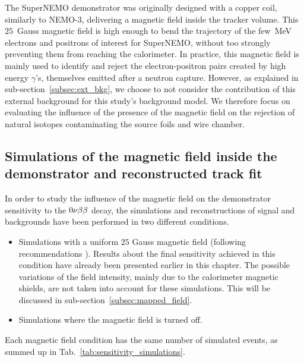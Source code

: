 The SuperNEMO demonstrator was originally designed with a copper coil, similarly to NEMO-$3$, delivering a magnetic field inside the tracker volume.
This $25$~Gauss magnetic field is high enough to bend the trajectory of the few~MeV electrons and positrons of interest for SuperNEMO, without too strongly preventing them from reaching the calorimeter.
In practice, this magnetic field is mainly used to identify and reject the electron-positron pairs created by high energy $\gamma$’s, themselves emitted after a neutron capture.
However, as explained in sub-section~\ref{subsec:ext_bkg}, we choose to not consider the contribution of this external background for this study's background model.
We therefore focus on evaluating the influence of the presence of the magnetic field on the rejection of natural isotopes contaminating the source foils and wire chamber.





\subsection{Simulations of the magnetic field inside the demonstrator and reconstructed track fit}

In order to study the influence of the magnetic field on the demonstrator sensitivity to the $0\nu\beta\beta$ decay, the simulations and reconstructions of signal and backgrounds have been performed in two different conditions.
\begin{itemize}
\item Simulations with a uniform $25$ Gauss magnetic field (following recommendations \cite{CalvezThesis}).
  Results about the final sensitivity achieved in this condition have already been presented earlier in this chapter.
  The possible variations of the field intensity, mainly due to the calorimeter magnetic shields, are not taken into account for these simulations.
  This will be discussed in sub-section~\ref{subsec:mapped_field}.
\item Simulations where the magnetic field is turned off.
\end{itemize}
Each magnetic field condition has the same number of simulated events, as summed up in Tab.~\ref{tab:sensitivity_simulations}.

